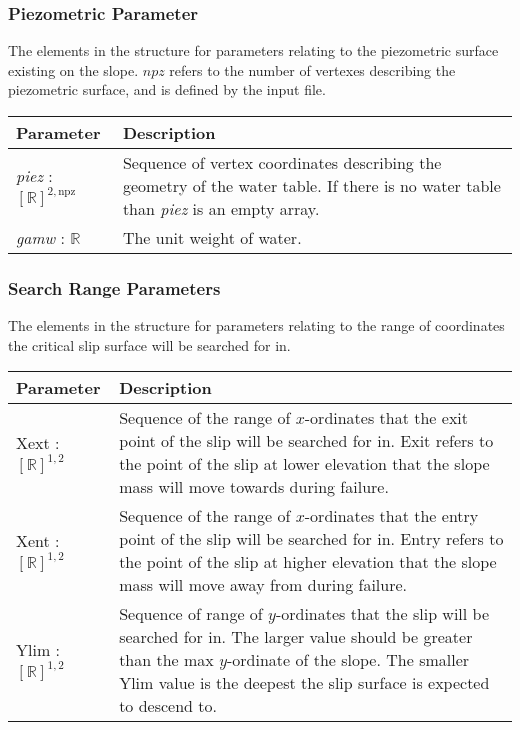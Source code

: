 \documentclass[12pt, titlepage]{article}
\begin{document}
\subsubsection{Piezometric Parameter} \label{Tbl:PiezParam}
\noindent
The elements in the structure for parameters relating to the
piezometric surface existing on the slope. $npz$ refers to the number
of vertexes describing the piezometric surface, and is defined by the
input file.

\begin{center}
\begin{longtable}{ p{}
    p{}}\hline 
  \textbf{Parameter} & \textbf{Description}\\ \hline

  \textit{piez} : $[\mathbb{R}]^{2,\text{npz}}$ & Sequence of vertex
  coordinates describing the geometry of the water table. If there is
  no water table than \textit{piez} is an empty array. \\

  \textit{gamw} : $\mathbb{R}$ & The unit weight of water. \\ \hline
\end{longtable}
\end{center}

\subsubsection{Search Range Parameters} \label{Tbl:SearchParam}
\noindent
The elements in the structure for parameters relating to the range of
coordinates the critical slip surface will be searched for in.

\begin{center}
\begin{tabular}{ p{}
    p{}}\hline 

  \textbf{Parameter} &
  \textbf{Description}\\ \hline

  Xext : $[\mathbb{R}]^{1,2}$ & Sequence of the range of $x$-ordinates
  that the exit point of the slip will be searched for in. Exit refers
  to the point of the slip at lower elevation that the slope mass will
  move towards during failure. \\

  Xent : $[\mathbb{R}]^{1,2}$ & Sequence of the range of $x$-ordinates
  that the entry point of the slip will be searched for in. Entry
  refers to the point of the slip at higher elevation that the slope
  mass will move away from during failure. \\

  Ylim : $[\mathbb{R}]^{1,2}$ & Sequence of range of $y$-ordinates
  that the slip will be searched for in. The larger value should be
  greater than the max $y$-ordinate of the slope. The smaller Ylim
  value is the deepest the slip surface is expected to descend
  to.\\ \hline
\end{tabular}
\end{center}
\end{document}
